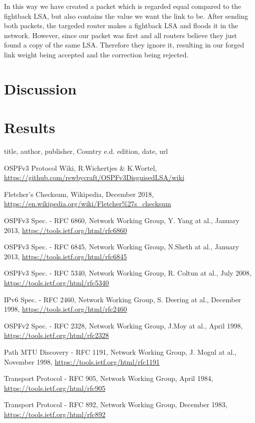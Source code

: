 \documentclass[11pt,a4paper,oneside]{article}
\newcommand{\lsection}[2]{\section{#1}\label{sec:#2}}
\begin{document}
    				In this way we have created a packet which is regarded equal compared to the fightback LSA, but also contains the value we want the link to be. After sending both packets, the targeded router makes a fightback LSA and floods it in the network. However, since our packet was first and all routers believe they just found a copy of the same LSA. Therefore they ignore it, resulting in our forged link weight being accepted and the correction being rejected.
    				
    \lsection{Discussion}{discussion}
    		
    		
    		
    \lsection{Results}{results}
    		
    
    
    \begin{thebibliography}{999}
title,
author,
publisher,
Country e.d.
edition,
date,
url

OSPFv3 Protocol Wiki,
R.Wichertjes \& K.Wortel,
\url{https://github.com/rewbycraft/OSPFv3DisguisedLSA/wiki}

Fletcher's Checksum,
Wikipedia,
December 2018,
\url{https://en.wikipedia.org/wiki/Fletcher\%27s_checksum}


OSPFv3 Spec. - RFC 6860,
Network Working Group,
Y. Yang at al.,
January 2013,
\url{https://tools.ietf.org/html/rfc6860}

OSPFv3 Spec. - RFC 6845,
Network Working Group,
N.Sheth at al.,
January 2013,
\url{https://tools.ietf.org/html/rfc6845}

OSPFv3 Spec. - RFC 5340,
Network Working Group,
R. Coltun at al.,
July 2008,
\url{https://tools.ietf.org/html/rfc5340}

IPv6 Spec. - RFC 2460,
Network Working Group,
S. Deering at al.,
December 1998,
\url{https://tools.ietf.org/html/rfc2460}

OSPFv2 Spec. - RFC 2328,
Network Working Group,
J.Moy at al.,
April 1998,
\url{https://tools.ietf.org/html/rfc2328}

Path MTU Discovery - RFC 1191,
Network Working Group,
J. Mogul at al.,
November 1998,
\url{https://tools.ietf.org/html/rfc1191}

Transport Protocol - RFC 905,
Network Working Group,
April 1984,
\url{https://tools.ietf.org/html/rfc905}

Transport Protocol - RFC 892,
Network Working Group,
December 1983,
\url{https://tools.ietf.org/html/rfc892}

    \end{thebibliography}
\end{document}
